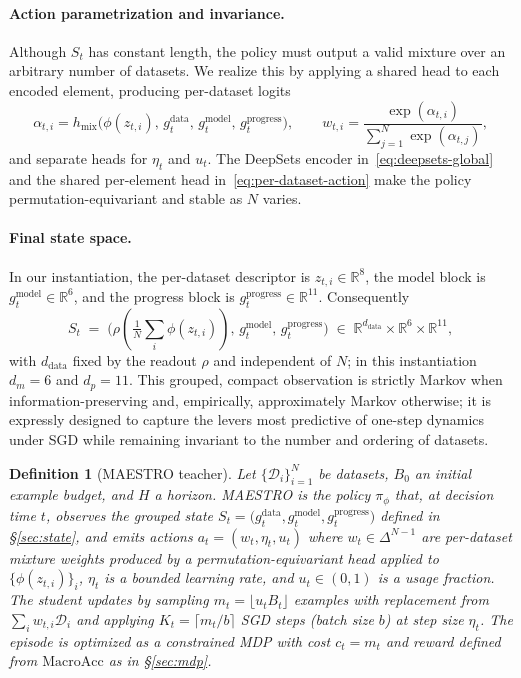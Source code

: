 \documentclass[11pt]{article}
\newtheorem{definition}{Definition}
\newcommand{\MacroAcc}{\mathrm{MacroAcc}}
\newcommand{\R}{\mathbb{R}}
\newcommand{\1}{\mathbf{1}}
\newcommand{\MAESTRO}{\textsc{MAESTRO}\xspace}
\begin{document}
\paragraph{Action parametrization and invariance.}
Although $S_t$ has constant length, the policy must output a valid mixture over an arbitrary number of datasets. We realize this by applying a shared head to each encoded element, producing per-dataset logits
\begin{equation}
\alpha_{t,i}=h_{\text{mix}}\!\big(\phi(z_{t,i}),\, g^{\text{data}}_t,\, g^{\text{model}}_t,\, g^{\text{progress}}_t\big),
\qquad
w_{t,i}=\frac{\exp(\alpha_{t,i})}{\sum_{j=1}^N \exp(\alpha_{t,j})},
\label{eq:per-dataset-action}
\end{equation}
and separate heads for $\eta_t$ and $u_t$. The DeepSets encoder in~\eqref{eq:deepsets-global} and the shared per-element head in~\eqref{eq:per-dataset-action} make the policy permutation-equivariant and stable as $N$ varies.

\paragraph{Final state space.}
In our instantiation, the per-dataset descriptor is $z_{t,i}\in\R^{8}$, the model block is $g^{\text{model}}_t\in\R^{6}$, and the progress block is $g^{\text{progress}}_t\in\R^{11}$. Consequently
\[
S_t \;=\; \big(\rho(\tfrac{1}{N}\sum_i \phi(z_{t,i})),\, g^{\text{model}}_t,\, g^{\text{progress}}_t\big)
\;\in\;
\R^{d_{\text{data}}}\times\R^{6}\times\R^{11},
\]
with $d_{\text{data}}$ fixed by the readout $\rho$ and independent of $N$; in this instantiation $d_m=6$ and $d_p=11$. This grouped, compact observation is strictly Markov when information-preserving and, empirically, approximately Markov otherwise; it is expressly designed to capture the levers most predictive of one-step dynamics under SGD while remaining invariant to the number and ordering of datasets.

\begin{definition}[\MAESTRO{} teacher]\label{def:maestro}
Let $\{\mathcal D_i\}_{i=1}^N$ be datasets, $B_0$ an initial example budget, and $H$ a horizon. \MAESTRO{} is the policy $\pi_\phi$ that, at decision time $t$, observes the grouped state $S_t=\big(g^{\mathrm{data}}_t,g^{\mathrm{model}}_t,g^{\mathrm{progress}}_t\big)$ defined in \S\ref{sec:state}, and emits actions $a_t=(w_t,\eta_t,u_t)$ where $w_t\in\Delta^{N-1}$ are per-dataset mixture weights produced by a permutation-equivariant head applied to $\{\phi(z_{t,i})\}_i$, $\eta_t$ is a bounded learning rate, and $u_t\in(0,1)$ is a usage fraction. The student updates by sampling $m_t=\lfloor u_t B_t\rfloor$ examples \emph{with replacement} from $\sum_i w_{t,i}\mathcal D_i$ and applying $K_t=\lceil m_t/b\rceil$ SGD steps (batch size $b$) at step size $\eta_t$. The episode is optimized as a constrained MDP with cost $c_t=m_t$ and reward defined from $\MacroAcc$ as in \S\ref{sec:mdp}.
\end{definition}
\end{document}
